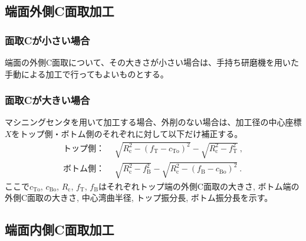 \subsection{端面外側C面取加工}

\subsubsection{面取Cが小さい場合}
端面の外側C面取について、その大きさが小さい場合は、手持ち研磨機を用いた手動による加工で行ってもよいものとする。

\subsubsection{面取Cが大きい場合}
マシニングセンタを用いて加工する場合、外削のない場合は、加工径の中心座標$X$をトップ側・ボトム側のそれぞれに対して以下だけ補正する。
\begin{align*}
  \text{トップ側：}&~~
  \sqrt{R_\mathrm c^2-\left(f_\mathrm T-c_\mathrm{To}\right)^2}-\sqrt{R_\mathrm c^2-f_\mathrm T^2}\ ,\\
  \text{ボトム側：}&~~
  \sqrt{R_\mathrm c^2-f_\mathrm B^2}-\sqrt{R_\mathrm c^2-\left(f_\mathrm B-c_\mathrm{Bo}\right)^2}\ .
\end{align*}
ここで$c_\mathrm{To}$, $c_\mathrm{Bo}$, $R_\mathrm c$, $f_\mathrm T$, $f_\mathrm B$はそれぞれトップ端の外側C面取の大きさ, ボトム端の外側C面取の大きさ, 中心湾曲半径, トップ振分長, ボトム振分長を示す。


\clearpage
\subsection{端面内側C面取加工}

